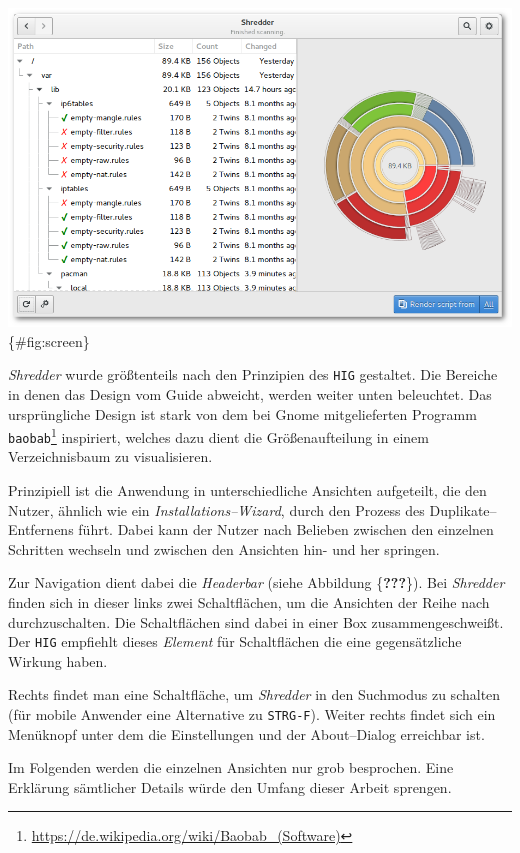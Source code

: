 \documentclass[11pt,ngerman,toc=listof,index=totoc]{scrreprt}
\begin{document}
\includegraphics{docs/pics/shredder_screen.png} \{\#fig:screen\}

\emph{Shredder} wurde größtenteils nach den Prinzipien des \texttt{HIG}
gestaltet. Die Bereiche in denen das Design vom Guide abweicht, werden
weiter unten beleuchtet. Das ursprüngliche Design ist stark von dem bei
Gnome mitgelieferten Programm \texttt{baobab}\footnote{\url{https://de.wikipedia.org/wiki/Baobab_(Software)}}
inspiriert, welches dazu dient die Größenaufteilung in einem
Verzeichnisbaum zu visualisieren.

Prinzipiell ist die Anwendung in unterschiedliche Ansichten aufgeteilt,
die den Nutzer, ähnlich wie ein \emph{Installations--Wizard}, durch den
Prozess des Duplikate--Entfernens führt. Dabei kann der Nutzer nach
Belieben zwischen den einzelnen Schritten wechseln und zwischen den
Ansichten hin- und her springen.

Zur Navigation dient dabei die \emph{Headerbar} (siehe Abbildung
\{\textbf{???}\}). Bei \emph{Shredder} finden sich in dieser links zwei
Schaltflächen, um die Ansichten der Reihe nach durchzuschalten. Die
Schaltflächen sind dabei in einer Box zusammengeschweißt. Der
\texttt{HIG} empfiehlt dieses \emph{Element} für Schaltflächen die eine
gegensätzliche Wirkung haben.

Rechts findet man eine Schaltfläche, um \emph{Shredder} in den Suchmodus
zu schalten (für mobile Anwender eine Alternative zu \texttt{STRG-F}).
Weiter rechts findet sich ein Menüknopf unter dem die Einstellungen und
der About--Dialog erreichbar ist.

Im Folgenden werden die einzelnen Ansichten nur grob besprochen. Eine
Erklärung sämtlicher Details würde den Umfang dieser Arbeit sprengen.
\end{document}
